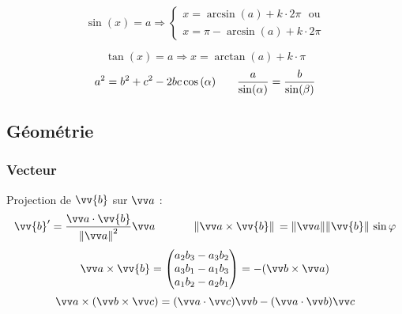 \documentclass[../main.tex]{subfiles}
\begin{document}
\[
  \sin(x)=a \Rightarrow
  \begin{cases}
    x = \arcsin(a) + k\cdot 2\pi \,\,\,\,\text{ou}\\
    x = \pi - \arcsin(a) + k\cdot 2\pi 
  \end{cases}
\]

\[\tan(x)= a \Rightarrow x = \arctan(a) + k\cdot\pi\]
\[
  a^2 = b^2 + c^2 - 2bc\cos\left(\alpha\right)\phantom{text} \frac{a}{\sin(\alpha)}=\frac{b}{\sin(\beta)} 
\]


\renewcommand{\arraystretch}{1}

\subsection{Géométrie}
\subsubsection{Vecteur}

Projection de \(\vv{b}\) sur \(\ac\) : 
\[
  \vv{b}' = \frac{\ac\cdot\vv{b}}{\norm{\ac}^2}\ac \phantom{texttext} 
  \norm*{\ac\times\vv{b}}=\norm{\ac}\norm*{\vv{b}}\sin\varphi
\]
\[
  \ac\times\vv{b}=\begin{pmatrix}
    a_2b_3 - a_3b_2 \\ 
    a_3b_1 - a_1b_3 \\ 
    a_1b_2 - a_2b_1
  \end{pmatrix}
  =-(\vecb\times\veca)
\]
\[
  \veca\times(\vecb\times\vecc)=(\veca\cdot\vecc)\vecb - (\veca\cdot\vecb)\vecc
\]
\end{document}
